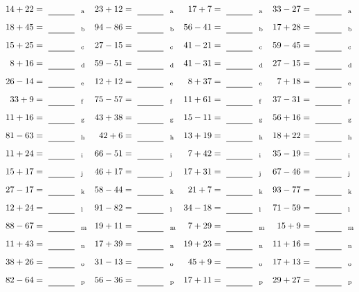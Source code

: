 \documentclass
[
  draft    = true,
  fontsize = 11pt,
  parskip  = half-
]
{scrartcl}
\begin{document}
\clearpage
\begin{align*}
    \pline{14+22}&=\rline{a}
  & \pline{23+12}&=\rline{a}
  & \pline{17+7}&=\rline{a}
  & \pline{33-27}&=\rline{a} \\[1ex]
    \pline{18+45}&=\rline{b}
  & \pline{94-86}&=\rline{b}
  & \pline{56-41}&=\rline{b}
  & \pline{17+28}&=\rline{b} \\[1ex]
    \pline{15+25}&=\rline{c}
  & \pline{27-15}&=\rline{c}
  & \pline{41-21}&=\rline{c}
  & \pline{59-45}&=\rline{c} \\[1ex]
    \pline{8+16}&=\rline{d}
  & \pline{59-51}&=\rline{d}
  & \pline{41-31}&=\rline{d}
  & \pline{27-15}&=\rline{d} \\[1ex]
    \pline{26-14}&=\rline{e}
  & \pline{12+12}&=\rline{e}
  & \pline{8+37}&=\rline{e}
  & \pline{7+18}&=\rline{e} \\[1ex]
    \pline{33+9}&=\rline{f}
  & \pline{75-57}&=\rline{f}
  & \pline{11+61}&=\rline{f}
  & \pline{37-31}&=\rline{f} \\[1ex]
    \pline{11+16}&=\rline{g}
  & \pline{43+38}&=\rline{g}
  & \pline{15-11}&=\rline{g}
  & \pline{56+16}&=\rline{g} \\[1ex]
    \pline{81-63}&=\rline{h}
  & \pline{42+6}&=\rline{h}
  & \pline{13+19}&=\rline{h}
  & \pline{18+22}&=\rline{h} \\[1ex]
    \pline{11+24}&=\rline{i}
  & \pline{66-51}&=\rline{i}
  & \pline{7+42}&=\rline{i}
  & \pline{35-19}&=\rline{i} \\[1ex]
    \pline{15+17}&=\rline{j}
  & \pline{46+17}&=\rline{j}
  & \pline{17+31}&=\rline{j}
  & \pline{67-46}&=\rline{j} \\[1ex]
    \pline{27-17}&=\rline{k}
  & \pline{58-44}&=\rline{k}
  & \pline{21+7}&=\rline{k}
  & \pline{93-77}&=\rline{k} \\[1ex]
    \pline{12+24}&=\rline{l}
  & \pline{91-82}&=\rline{l}
  & \pline{34-18}&=\rline{l}
  & \pline{71-59}&=\rline{l} \\[1ex]
    \pline{88-67}&=\rline{m}
  & \pline{19+11}&=\rline{m}
  & \pline{7+29}&=\rline{m}
  & \pline{15+9}&=\rline{m} \\[1ex]
    \pline{11+43}&=\rline{n}
  & \pline{17+39}&=\rline{n}
  & \pline{19+23}&=\rline{n}
  & \pline{11+16}&=\rline{n} \\[1ex]
    \pline{38+26}&=\rline{o}
  & \pline{31-13}&=\rline{o}
  & \pline{45+9}&=\rline{o}
  & \pline{17+13}&=\rline{o} \\[1ex]
    \pline{82-64}&=\rline{p}
  & \pline{56-36}&=\rline{p}
  & \pline{17+11}&=\rline{p}
  & \pline{29+27}&=\rline{p}
\end{align*}
\end{document}
